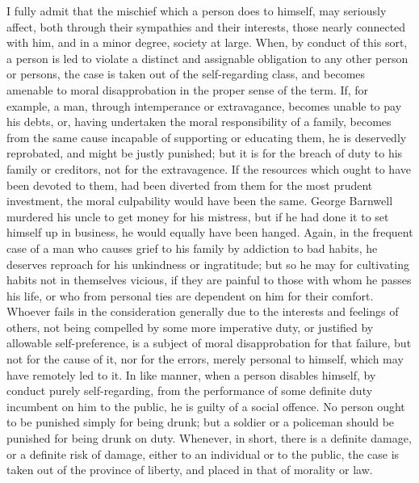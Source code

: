 \documentclass[12pt]{report}
\begin{document}
I fully admit that the mischief which a person does to himself, may seriously affect, both through their sympathies and their interests, those nearly connected with him, and in a minor degree, society at large. When, by conduct of this sort, a person is led to violate a distinct and assignable obligation to any other person or persons, the case is taken out of the self-regarding class, and becomes amenable to moral disapprobation in the proper sense of the term. If, for example, a man, through intemperance or extravagance, becomes unable to pay his debts, or, having undertaken the moral responsibility of a family, becomes from the same cause incapable of supporting or educating them, he is deservedly reprobated, and might be justly punished; but it is for the breach of duty to his family or creditors, not for the extravagence. If the resources which ought to have been devoted to them, had been diverted from them for the most prudent investment, the moral culpability would have been the same. George Barnwell murdered his uncle to get money for his mistress, but if he had done it to set himself up in business, he would equally have been hanged. Again, in the frequent case of a man who causes grief to his family by addiction to bad habits, he deserves reproach for his unkindness or ingratitude; but so he may for cultivating habits not in themselves vicious, if they are painful to those with whom he passes his life, or who from personal ties are dependent on him for their comfort. Whoever fails in the consideration generally due to the interests and feelings of others, not being compelled by some more imperative duty, or justified by allowable self-preference, is a subject of moral disapprobation for that failure, but not for the cause of it, nor for the errors, merely personal to himself, which may have remotely led to it. In like manner, when a person disables himself, by conduct purely self-regarding, from the performance of some definite duty incumbent on him to the public, he is guilty of a social offence. No person ought to be punished simply for being drunk; but a soldier or a policeman should be punished for being drunk on duty. Whenever, in short, there is a definite damage, or a definite risk of damage, either to an individual or to the public, the case is taken out of the province of liberty, and placed in that of morality or law.
\end{document}
